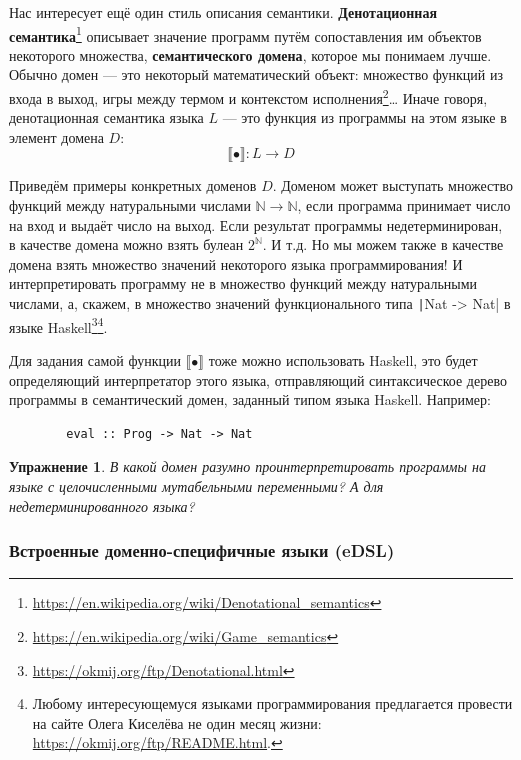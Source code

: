 \documentclass[12pt]{article}
\newcommand{\vocab}[1]{\textbf{#1}} %
\newcommand{\sembr}[1]{\llbracket{#1}\rrbracket} %
\newtheorem{task}{Упражнение}
\begin{document}
    Нас интересует ещё один стиль описания семантики.
    \vocab{Денотационная семантика}\footnote{\url{https://en.wikipedia.org/wiki/Denotational_semantics}} описывает значение программ путём сопоставления им объектов некоторого множества, \vocab{семантического домена}, которое мы понимаем лучше.
    Обычно домен --- это некоторый математический объект: множество функций из входа в выход, игры между термом и контекстом исполнения\footnote{\url{https://en.wikipedia.org/wiki/Game_semantics}}\ldots
    Иначе говоря, денотационная семантика языка $L$ --- это функция из программы на этом языке в элемент домена $D$:
    \[
        \sembr{\bullet} : L \to D
    \]

    Приведём примеры конкретных доменов $D$.
    Доменом может выступать множество функций между натуральными числами $\mathbb{N}\to\mathbb{N}$, если программа принимает число на вход и выдаёт число на выход.
    Если результат программы недетерминирован, в качестве домена можно взять булеан $2^\mathbb{N}$.
    И т.д.
    Но мы можем также в качестве домена взять множество значений некоторого языка программирования!
    И интерпретировать программу не в множество функций между натуральными числами, а, скажем, в множество значений функционального типа \texttt|Nat -> Nat| в языке Haskell\footnote{\url{https://okmij.org/ftp/Denotational.html}}\footnote{Любому интересующемуся языками программирования предлагается провести на сайте Олега Киселёва не один месяц жизни: \url{https://okmij.org/ftp/README.html}.}.

    Для задания самой функции $\sembr{\bullet}$ тоже можно использовать Haskell, это будет определяющий интерпретатор этого языка, отправляющий синтаксическое дерево программы в семантический домен, заданный типом языка Haskell.
    Например:
    \begin{verbatim}
        eval :: Prog -> Nat -> Nat
    \end{verbatim}

    \begin{task}
        В какой домен разумно проинтерпретировать программы на языке с целочисленными мутабельными переменными?
        А для недетерминированного языка?
    \end{task}

    \subsubsection{Встроенные доменно-специфичные языки (eDSL)}
\end{document}
